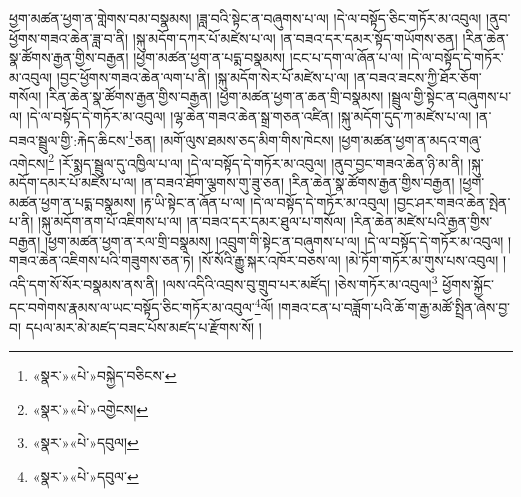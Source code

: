 ཕྱག་མཚན་ཕྱག་ན་གླེགས་བམ་བསྣམས། །ཟླ་བའི་སྟེང་ན་བཞུགས་པ་ལ། །དེ་ལ་བསྟོད་ཅིང་གཏོར་མ་འབུལ། །ནུབ་ཕྱོགས་གཟའ་ཆེན་ཟླ་བ་ནི། །སྐུ་མདོག་དཀར་པོ་མཛེས་པ་ལ། །ན་བཟའ་དར་དམར་སྟོད་གཡོགས་ཅན། །རིན་ཆེན་སྣ་ཚོགས་རྒྱན་གྱིས་བརྒྱན། །ཕྱག་མཚན་ཕྱག་ན་པདྨ་བསྣམས། །ངང་པ་དག་ལ་ཞོན་པ་ལ། །དེ་ལ་བསྟོད་དེ་གཏོར་མ་འབུལ། །བྱང་ཕྱོགས་གཟའ་ཆེན་ལག་པ་ནི། །སྐུ་མདོག་སེར་པོ་མཛེས་པ་ལ། །ན་བཟའ་ཟངས་ཀྱི་ཐོར་ཅོག་གསོལ། །རིན་ཆེན་སྣ་ཚོགས་རྒྱན་གྱིས་བརྒྱན། །ཕྱག་མཚན་ཕྱག་ན་ཆན་གྲི་བསྣམས། །སྦྲུལ་གྱི་སྟེང་ན་བཞུགས་པ་ལ། །དེ་ལ་བསྟོད་དེ་གཏོར་མ་འབུལ། །ལྷ་ཆེན་གཟའ་ཆེན་སྒྲ་གཅན་འཛིན། །སྐུ་མདོག་དུད་ཀ་མཛེས་པ་ལ། །ན་བཟའ་སྦྲུལ་གྱི་:རྐེད་ཆིངས་\footnote{«སྣར་»«པེ་»བསྐྱེད་བཅིངས་}ཅན། །མགོ་ལུས་ཐམས་ཅད་མིག་གིས་ཁེངས། །ཕྱག་མཚན་ཕྱག་ན་མདའ་གཞུ་འགེངས།\footnote{«སྣར་»«པེ་»འགྱེངས།} །རོ་སྨད་སྦྲུལ་དུ་འཁྱིལ་པ་ལ། །དེ་ལ་བསྟོད་དེ་གཏོར་མ་འབུལ། །ནུབ་བྱང་གཟའ་ཆེན་ཉི་མ་ནི། །སྐུ་མདོག་དམར་པོ་མཛེས་པ་ལ། །ན་བཟའ་ཐོག་ལྕགས་གུ་ཟུ་ཅན། །རིན་ཆེན་སྣ་ཚོགས་རྒྱན་གྱིས་བརྒྱན། །ཕྱག་མཚན་ཕྱག་ན་པདྨ་བསྣམས། །རྟ་ཡི་སྟེང་ན་ཞོན་པ་ལ། །དེ་ལ་བསྟོད་དེ་གཏོར་མ་འབུལ། །བྱང་ཤར་གཟའ་ཆེན་སྤེན་པ་ནི། །སྐུ་མདོག་ནག་པོ་འཇིགས་པ་ལ། །ན་བཟའ་དར་དམར་ཐུལ་པ་གསོལ། །རིན་ཆེན་མཛེས་པའི་རྒྱན་གྱིས་བརྒྱན། །ཕྱག་མཚན་ཕྱག་ན་རལ་གྲི་བསྣམས། །འབྲུག་གི་སྟེང་ན་བཞུགས་པ་ལ། །དེ་ལ་བསྟོད་དེ་གཏོར་མ་འབུལ། །གཟའ་ཆེན་འཇིགས་པའི་གཟུགས་ཅན་ཏེ། །སོ་སོའི་རྒྱུ་སྐར་འཁོར་བཅས་ལ། །མེ་ཏོག་གཏོར་མ་གུས་པས་འབུལ། །འདི་དག་སོ་སོར་བསྣམས་ནས་ནི། །ལས་འདིའི་འབྲས་བུ་གྲུབ་པར་མཛོད། །ཅེས་གཏོར་མ་འབུལ།\footnote{«སྣར་»«པེ་»དབུལ།} ཕྱོགས་སྐྱོང་དང་བགེགས་རྣམས་ལ་ཡང་བསྟོད་ཅིང་གཏོར་མ་འབུལ་\footnote{«སྣར་»«པེ་»དབུལ་}ལོ། །གཟའ་ངན་པ་བཟློག་པའི་ཆོ་ག་རྒྱ་མཚོ་སྤྲིན་ཞེས་བྱ་བ། དཔལ་མར་མེ་མཛད་བཟང་པོས་མཛད་པ་རྫོགས་སོ། ། 